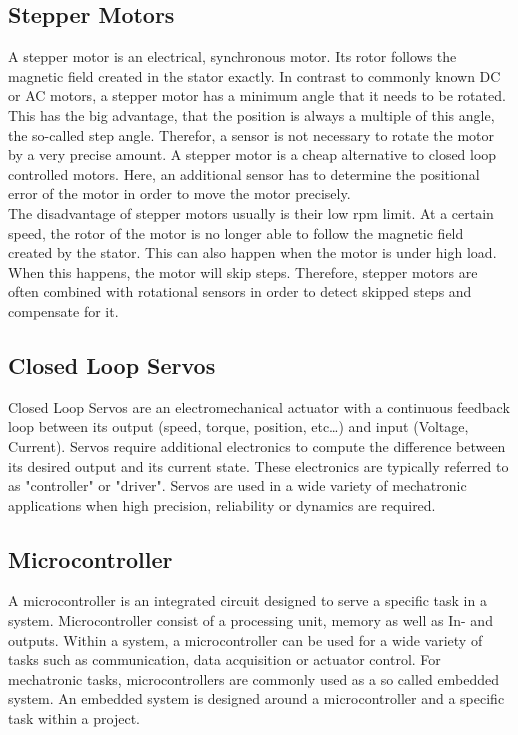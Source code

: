  
\subsection{Stepper Motors}
A stepper motor is an electrical, synchronous motor. Its rotor follows the magnetic field created in the stator exactly. In contrast to commonly known DC or AC motors, a stepper motor has a minimum angle that it needs to be rotated.
This has the big advantage, that the position is always a multiple of this angle, the so-called step angle. Therefor, a sensor is not necessary to rotate the motor by a very precise amount. A stepper motor is a cheap alternative to closed loop controlled motors. Here, an additional sensor has to determine the positional error of the motor in order to move the motor precisely.\\
The disadvantage of stepper motors usually is their low rpm limit. At a certain speed, the rotor of the motor is no longer able to follow the magnetic field created by the stator.
This can also happen when the motor is under high load. When this happens, the motor will skip steps. Therefore, stepper motors are often combined with rotational sensors in order to detect skipped steps and compensate for it.\cite{SchrittmotorenFaulhaber2022}
 
\subsection{Closed Loop Servos}
Closed Loop Servos are an electromechanical actuator with a continuous feedback loop between its output (speed, torque, position, etc…) and input (Voltage, Current).
Servos require additional electronics to compute the difference between its desired output and its current state. These electronics are typically referred to as "controller" or "driver".
Servos are used in a wide variety of mechatronic applications when high precision, reliability or dynamics are required.\cite{ServoSuh2008}
 
\subsection{Microcontroller}
A microcontroller is an integrated circuit designed to serve a specific task in a system. Microcontroller consist of a processing unit, memory as well as In- and outputs.
Within a system, a microcontroller can be used for a wide variety of tasks such as communication, data acquisition or actuator control. For mechatronic tasks, microcontrollers are commonly used as a so called embedded system.
An embedded system is designed around a microcontroller and a specific task within a project.\cite{UensalanMicrocont2022}
 

